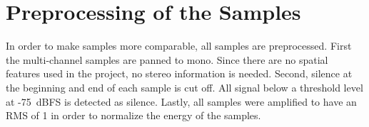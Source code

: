 \section{Preprocessing of the Samples}
\label{sec:Preprocessing}
In order to make samples more comparable, all samples are preprocessed. First the multi-channel samples are panned to mono. Since there are no spatial features used in the project, no stereo information is needed. Second, silence at the beginning and end of each sample is cut off. All signal below a threshold level at -75~dBFS is detected as silence. Lastly, all samples were amplified to have an RMS of 1 in order to normalize the energy of the samples.